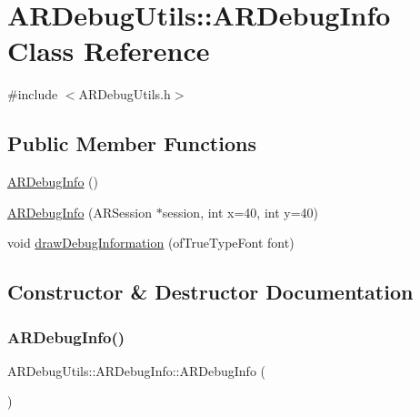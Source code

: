 \hypertarget{class_a_r_debug_utils_1_1_a_r_debug_info}{}\section{A\+R\+Debug\+Utils\+:\+:A\+R\+Debug\+Info Class Reference}
\label{class_a_r_debug_utils_1_1_a_r_debug_info}


{\ttfamily \#include $<$A\+R\+Debug\+Utils.\+h$>$}

\subsection*{Public Member Functions}
\begin{DoxyCompactItemize}
\item 
\hyperlink{class_a_r_debug_utils_1_1_a_r_debug_info_aeb168fa1784b8977ac39358347e22d68}{A\+R\+Debug\+Info} ()
\item 
\hyperlink{class_a_r_debug_utils_1_1_a_r_debug_info_ad09bdc5defd7837ed74261bc3bf3a096}{A\+R\+Debug\+Info} (A\+R\+Session $\ast$session, int x=40, int y=40)
\item 
void \hyperlink{class_a_r_debug_utils_1_1_a_r_debug_info_a480025850cdabb91cfc13a2cf8351114}{draw\+Debug\+Information} (of\+True\+Type\+Font font)
\end{DoxyCompactItemize}


\subsection{Constructor \& Destructor Documentation}
\mbox{\label{class_a_r_debug_utils_1_1_a_r_debug_info_aeb168fa1784b8977ac39358347e22d68}} 
\subsubsection{\texorpdfstring{A\+R\+Debug\+Info()}{ARDebugInfo()}\hspace{0.1cm}{\footnotesize\ttfamily [1/2]}}
{\footnotesize\ttfamily A\+R\+Debug\+Utils\+::\+A\+R\+Debug\+Info\+::\+A\+R\+Debug\+Info (\begin{DoxyParamCaption}{ }\end{DoxyParamCaption})\hspace{0.3cm}{\ttfamily [inline]}}


